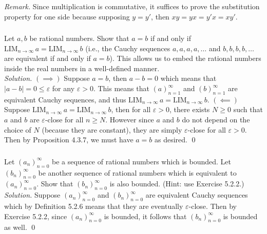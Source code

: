 \documentclass{amsart}
\theoremstyle{definition}
\newcommand{\soln}{\newline\textit{Solution.} }
\newcommand{\LIM}{\mathrm{LIM}_{n\to\infty}\,}
\begin{document}
\textit{Remark.} Since multiplication is commutative, it suffices to prove the substitution property for one side because supposing $y=y'$, then $xy=yx=y'x=xy'$. \\

\subsubsection{} Let $a,b$ be rational numbers. Show that $a=b$ if and only if $\LIM a=\LIM b$ (i.e., the Cauchy sequences $a,a,a,a,\dots$ and $b,b,b,b,\dots$ are equivalent if and only if $a=b$). This allows us to embed the rational numbers inside the real numbers in a well-defined manner. \\
\soln $(\implies)$ Suppose $a=b$, then $a-b=0$ which means that $|a-b|=0\leq \varepsilon$ for any $\varepsilon>0$. This means that $(a)_{n=1}^\infty$ and $(b)_{n=1}^\infty$ are equivalent Cauchy sequences, and thus $\LIM a=\LIM b$. $(\impliedby)$ Suppose $\LIM a=\LIM b$, then for all $\varepsilon>0$, there exists $N\geq0$ such that $a$ and $b$ are $\varepsilon$-close for all $n\geq N$. However since $a$ and $b$ do not depend on the choice of $N$ (because they are constant), they are simply $\varepsilon$-close for all $\varepsilon>0$. Then by Proposition 4.3.7, we must have $a=b$ as desired. \qed \\


\subsubsection{} Let $(a_n)_{n=0}^\infty$ be a sequence of rational numbers which is bounded. Let $(b_n)_{n=0}^\infty$ be another sequence of rational numbers which is equivalent to $(a_n)_{n=0}^\infty$. Show that $(b_n)_{n=0}^\infty$ is also bounded. (Hint: use Exercise 5.2.2.) \\
\soln Suppose $(a_n)_{n=0}^\infty$ and $(b_n)_{n=0}^\infty$ are equivalent Cauchy sequences which by Definition 5.2.6 means that they are eventually $\varepsilon$-close. Then by Exercise 5.2.2, since $(a_n)_{n=0}^\infty$ is bounded, it follows that $(b_n)_{n=0}^\infty$ is bounded as well. \qed \\
\end{document}
